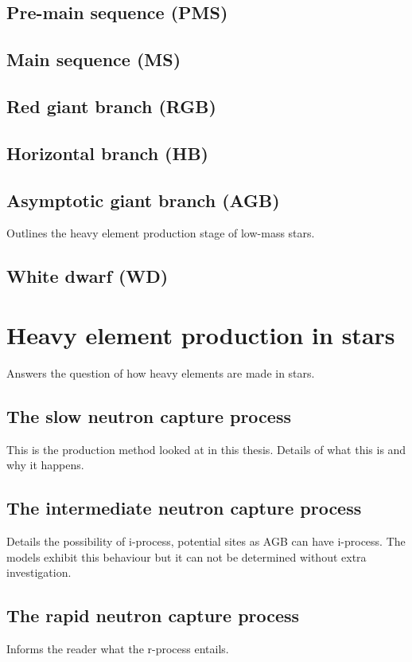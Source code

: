 \subsection{Pre-main sequence (PMS)}

\subsection{Main sequence (MS)}

\subsection{Red giant branch (RGB)}

\subsection{Horizontal branch (HB)}

\subsection{Asymptotic giant branch (AGB)}

Outlines the heavy element production stage of low-mass stars.

\subsection{White dwarf (WD)}

\section{Heavy element production in stars}

Answers the question of how heavy elements are made in stars.

\subsection{The slow neutron capture process}

This is the production method looked at in this thesis. Details of what this is and why it happens.

\subsection{The intermediate neutron capture process}

Details the possibility of i-process, potential sites as AGB can have i-process. The models exhibit this behaviour but it can not be determined without extra investigation.

\subsection{The rapid neutron capture process}

Informs the reader what the r-process entails.